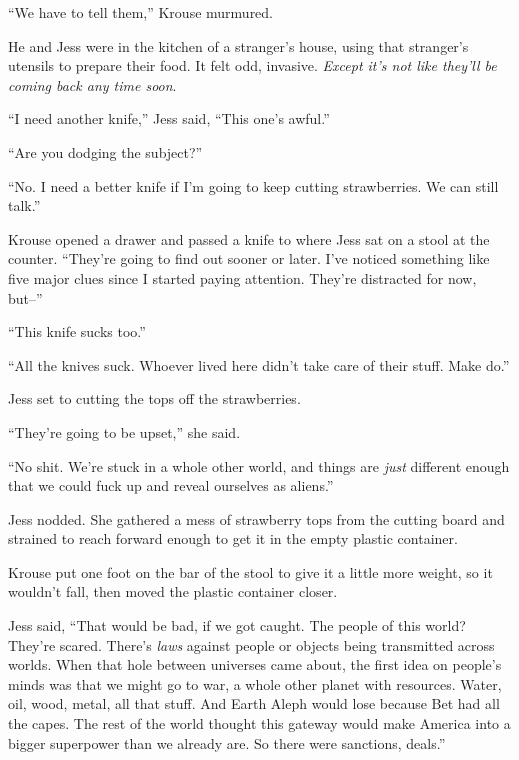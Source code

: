 





``We have to tell them,'' Krouse murmured.



He and Jess were in the kitchen of a stranger's house, using that stranger's utensils to prepare their food.  It felt odd, invasive.  \emph{Except it's not like they'll be coming back any time soon}.



``I need another knife,'' Jess said, ``This one's awful.''



``Are you dodging the subject?''



``No.  I need a better knife if I'm going to keep cutting strawberries.  We can still talk.''



Krouse opened a drawer and passed a knife to where Jess sat on a stool at the counter.  ``They're going to find out sooner or later.  I've noticed something like five major clues since I started paying attention.  They're distracted for now, but--''



``This knife sucks too.''



``All the knives suck.  Whoever lived here didn't take care of their stuff.  Make do.''



Jess set to cutting the tops off the strawberries.



``They're going to be upset,'' she said.



``No shit.  We're stuck in a whole other world, and things are \emph{just} different enough that we could fuck up and reveal ourselves as aliens.''



Jess nodded.  She gathered a mess of strawberry tops from the cutting board and strained to reach forward enough to get it in the empty plastic container.



Krouse put one foot on the bar of the stool to give it a little more weight, so it wouldn't fall, then moved the plastic container closer.



Jess said, ``That would be bad, if we got caught.  The people of this world?  They're scared.  There's \emph{laws} against people or objects being transmitted across worlds.  When that hole between universes came about, the first idea on people's minds was that we might go to war, a whole other planet with resources.  Water, oil, wood, metal, all that stuff.  And Earth Aleph would lose because Bet had all the capes.  The rest of the world thought this gateway would make America into a bigger superpower than we already are.  So there were sanctions, deals.''




